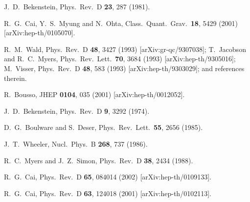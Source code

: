 \documentclass[a4paper,12pt]{article}
\begin{document}
\begin{thebibliography}{99}
J.~D.~Bekenstein,
Phys.\ Rev.\ D {\bf 23}, 287 (1981).

R.~G.~Cai, Y.~S.~Myung and N.~Ohta,
Class.\ Quant.\ Grav.\  {\bf 18}, 5429 (2001)
[arXiv:hep-th/0105070].


R.~M.~Wald,
Phys.\ Rev.\ D {\bf 48}, 3427 (1993)
[arXiv:gr-qc/9307038];
T.~Jacobson and R.~C.~Myers,
Phys.\ Rev.\ Lett.\  {\bf 70}, 3684 (1993) [arXiv:hep-th/9305016];
M.~Visser,
Phys.\ Rev.\ D {\bf 48}, 583 (1993)
[arXiv:hep-th/9303029];
and references therein.

R.~Bousso,
JHEP {\bf 0104}, 035 (2001)
[arXiv:hep-th/0012052].

J.~D.~Bekenstein,
Phys.\ Rev.\ D {\bf 9}, 3292 (1974).

D.~G.~Boulware and S.~Deser,
Phys.\ Rev.\ Lett.\  {\bf 55}, 2656 (1985).

J.~T.~Wheeler,
Nucl.\ Phys.\ B {\bf 268}, 737 (1986).

R.~C.~Myers and J.~Z.~Simon,
Phys.\ Rev.\ D {\bf 38}, 2434 (1988).

R.~G.~Cai,
Phys.\ Rev.\ D {\bf 65}, 084014 (2002)
[arXiv:hep-th/0109133].

R.~G.~Cai,
Phys.\ Rev.\ D {\bf 63}, 124018 (2001)
[arXiv:hep-th/0102113].

\end{thebibliography}
\end{document}
